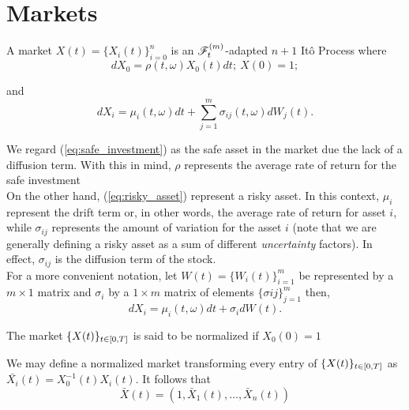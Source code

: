 \documentclass[../TGMAFFIRO.tex]{subfiles}
\begin{document}
\section{Markets}
\begin{definition}
	A market $X(t) = \{X_i(t)\}_{i=0}^n$ is an $\mathscr{F}^{(m)}_t$-adapted $n+1$ It\^o Process where
	\begin{equation}
		dX_0 = \rho(t,\omega) X_0(t) dt; \ X(0) = 1; \label{eq:safe_investment}
	\end{equation}
	
	and
	\begin{equation}
		dX_i = \mu_i(t,\omega) dt + \sum_{j=1}^{m}\sigma_{ij}(t,\omega)dW_j(t) \label{eq:risky_asset}.
	\end{equation}
\end{definition}

We regard (\ref{eq:safe_investment}) as the safe asset in the market due the lack of a diffusion term. With this in mind, $\rho$ represents the average rate of return for the safe investment\\

On the other hand, (\ref{eq:risky_asset}) represent a risky asset. In this context, $\mu_i$ represent the drift term or, in other words, the average rate of return for asset $i$, while $\sigma_{ij}$ represents the amount of variation for the asset $i$ (note that we are generally defining a risky asset as a sum of different \textit{uncertainty} factors). In effect, $\sigma_{ij}$ is the diffusion term of the stock.\\

For a more convenient notation, let $W(t) = \{W_i(t)\}_{i=1}^{m}$ be represented by a $m\times 1$ matrix and $\sigma_i$ by a $1\times m$ matrix of elements $\{\sigma{ij}\}_{j=1}^{m}$ then,
\begin{equation}
  dX_i = \mu_i(t,\omega) dt + \sigma_idW(t).
\end{equation}

\begin{definition}
	The market $\{X(t)\}_{t\in[0,T]}$ is said to be normalized if $X_0(0)= 1$
\end{definition}

We may define a normalized market transforming every entry of $\{X(t)\}_{t\in[0,T]}$ as $\bar{X_i}(t) = X_0^{-1}(t)X_i(t)$. It follows that
\begin{equation}
  \bar{X}(t) = (1, \bar{X}_1(t), \ldots, \bar{X}_n(t))
\end{equation}
\end{document}
